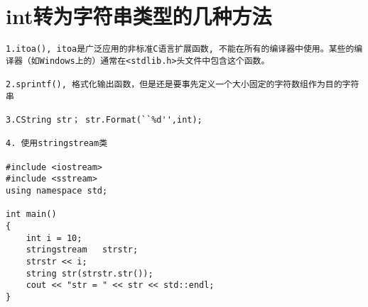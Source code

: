 \section{int转为字符串类型的几种方法}
\begin{verbatim}
1.itoa(), itoa是广泛应用的非标准C语言扩展函数, 不能在所有的编译器中使用。某些的编译器（如Windows上的）通常在<stdlib.h>头文件中包含这个函数。

2.sprintf(), 格式化输出函数，但是还是要事先定义一个大小固定的字符数组作为目的字符串

3.CString str； str.Format(``%d'',int);

4. 使用stringstream类

#include <iostream> 
#include <sstream>   
using namespace std;

int main() 
{ 
	int i = 10;   
	stringstream   strstr;   
	strstr << i;   
	string str(strstr.str());   
	cout << "str = " << str << std::endl;   
}

\end{verbatim}


